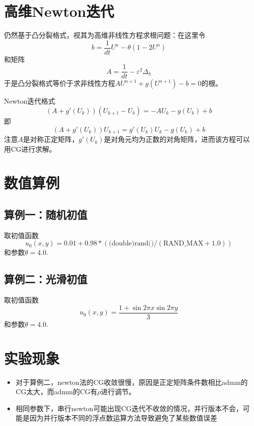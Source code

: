 \documentclass[11pt,a4 paper,one side]{article}
\begin{document}
\section{高维Newton迭代}
仍然基于凸分裂格式，视其为高维非线性方程求根问题：在这里令\begin{equation}
b=\frac{1}{dt}U^n-\theta(1-2U^n)
\end{equation}
和矩阵\begin{equation}
A = \frac{1}{dt}-\varepsilon^2 \Delta_h
\end{equation}
于是凸分裂格式等价于求非线性方程$AU^{n+1}+g(U^{n+1})-b=0$的根。
\par Newton迭代格式\begin{equation}
    (A+g'(U_{k}))(U_{k+1}-U_k) = -AU_k-g(U_k)+b
\end{equation}
即\begin{equation}
    (A+g'(U_k))U_{k+1}=g'(U_k)U_k-g(U_k)+b
\end{equation}
注意$A$是对称正定矩阵，$g'(U_k)$是对角元均为正数的对角矩阵，进而该方程可以用CG进行求解。
\section{数值算例}
\subsection{算例一：随机初值}取初值函数\begin{equation}
u_0(x,y)=0.01 + 0.98 * (\text{(double)rand()} / (\text{RAND\_MAX} + 1.0))
\end{equation}
和参数$\theta = 4.0$.
\subsection{算例二：光滑初值}取初值函数\begin{equation}
u_0(x,y)=\frac{1+\sin{2\pi x}\sin {2\pi y}}{3}
\end{equation}
和参数$\theta = 4.0$.
\section{实验现象}
\begin{itemize}
    \item 对于算例二，newton法的CG收敛很慢，原因是正定矩阵条件数相比admm的CG太大，而admm的CG有$\rho$进行调节。
    \item 相同参数下，串行newton可能出现CG迭代不收敛的情况，并行版本不会，可能是因为并行版本不同的浮点数运算方法导致避免了某些数值误差
\end{itemize}
\end{document}
